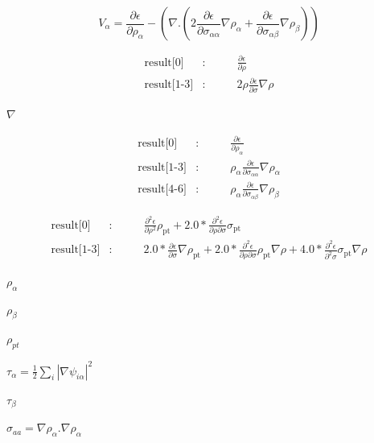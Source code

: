 \documentclass{article}
\begin{document}
\[   V_{\alpha} =  \frac{\partial \epsilon}{\partial \rho_{\alpha}}
                 - \left(\nabla . \left(2 \frac{\partial \epsilon}{\partial \sigma_{\alpha \alpha}} \nabla \rho_{\alpha}
                 + \frac{\partial \epsilon}{\partial \sigma_{\alpha \beta}} \nabla \rho_{\beta}  \right)  \right)
\]
\pagebreak

\begin{eqnarray*}    \mbox{result[0]}    &:& \qquad \frac{\partial \epsilon}{\partial \rho} \\
    \mbox{result[1-3]}  &:& \qquad 2 \rho \frac{\partial \epsilon}{\partial \sigma} \nabla\rho
\end{eqnarray*}
\pagebreak

$ \nabla $
\pagebreak

\begin{eqnarray*}    \mbox{result[0]}    &:& \qquad \frac{\partial \epsilon}{\partial \rho_{\alpha}} \\
    \mbox{result[1-3]}  &:& \qquad \rho_\alpha \frac{\partial \epsilon}{\partial \sigma_{\alpha \alpha}} \nabla\rho_\alpha\\
    \mbox{result[4-6]}  &:& \qquad \rho_\alpha \frac{\partial \epsilon}{\partial \sigma_{\alpha \beta}} \nabla\rho_\beta
\end{eqnarray*}
\pagebreak

\begin{eqnarray*}    \mbox{result[0]}    &:& \qquad \frac{\partial^2 \epsilon}{\partial \rho^2} \rho_\mathrm{pt}
                            + 2.0 * \frac{\partial^2 \epsilon}{\partial \rho\partial\sigma}\sigma_\mathrm{pt}\\
    \mbox{result[1-3]}  &:& \qquad 2.0 * \frac{\partial\epsilon}{\partial\sigma}\nabla\rho_\mathrm{pt}
                            + 2.0 * \frac{\partial^2\epsilon}{\partial\rho\partial\sigma} \rho_\mathrm{pt}\nabla\rho
                            + 4.0 * \frac{\partial^2\epsilon}{\partial^2\sigma} \sigma_\mathrm{pt}\nabla\rho
\end{eqnarray*}
\pagebreak

$ \rho_\alpha $
\pagebreak

$ \rho_\beta $
\pagebreak

$ \rho_{pt} $
\pagebreak

$ \tau_\alpha = \frac{1}{2}\sum_i|\nabla\psi_{i\alpha}|^2 $
\pagebreak

$ \tau_\beta $
\pagebreak

$ \sigma_{aa} = \nabla \rho_{\alpha}.\nabla \rho_{\alpha} $
\pagebreak
\end{document}
